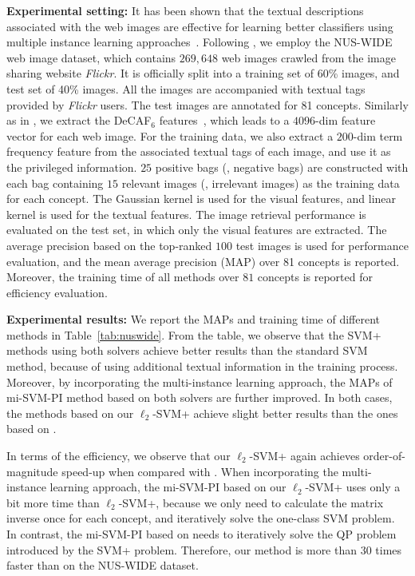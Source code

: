 \noindent\textbf{Experimental setting:} It has been shown that the
textual descriptions associated with the web images are effective for
learning better classifiers using multiple instance learning
approaches~\cite{Li2014ECCV,NiuIJCV2015}.  Following \cite{Li2014ECCV,
  NiuIJCV2015}, we employ the NUS-WIDE web image dataset, which
contains $269, 648$ web images crawled from the image sharing website
\emph{Flickr}. It is officially split into a training set of 60\%
images, and test set of 40\% images. All the images are accompanied
with textual tags provided by \emph{Flickr} users. The test images are
annotated for 81 concepts. Similarly as in \cite{Li2014ECCV}, we
extract the DeCAF$_6$ features~\cite{decaf}, which leads to a
$4096$-dim feature vector for each web image. For the training data,
we also extract a $200$-dim term frequency feature from the associated
textual tags of each image, and use it as the privileged
information. $25$ positive bags (\resp, negative bags) are constructed
with each bag containing $15$ relevant images (\resp, irrelevant
images) as the training data for each concept. The Gaussian kernel is
used for the visual features, and linear kernel is used for the
textual features. The image retrieval performance is evaluated on the
test set, in which only the visual features are extracted. The average
precision based on the top-ranked $100$ test images is used for
performance evaluation, and the mean average precision (MAP) over 81
concepts is reported. Moreover, the training time of all methods over
$81$ concepts is reported for efficiency evaluation.

\noindent\textbf{Experimental results:} We report the MAPs and training time of different methods in Table~\ref{tab:nuswide}. From the table, we observe that the SVM+ methods using both solvers achieve better results than the standard SVM method, because of using additional textual information in the training process. Moreover, by incorporating the multi-instance learning approach, the MAPs of mi-SVM-PI method based on both solvers are further improved. In both cases, the methods based on our $\ell_2$-SVM+ achieve slight better results than the ones based on \matlab.

In terms of the efficiency, we observe that our $\ell_2$-SVM+ again achieves order-of-magnitude speed-up when compared with \matlab. When incorporating the multi-instance learning approach, the mi-SVM-PI based on our $\ell_2$-SVM+ uses only a bit more time than $\ell_2$-SVM+, because we only need to calculate the matrix inverse once for each concept, and iteratively solve the one-class SVM problem. In contrast, the mi-SVM-PI based on \matlab needs to iteratively solve the QP problem introduced by the SVM+ problem. Therefore, our method is more than 30 times faster than \matlab on the NUS-WIDE dataset.

